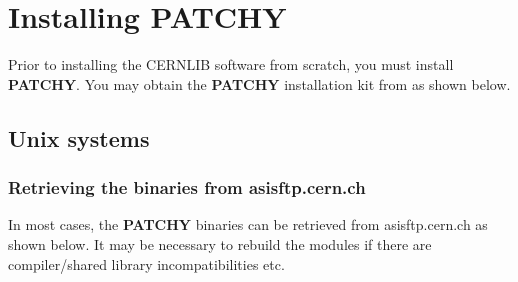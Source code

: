\chapter{Installing PATCHY}

Prior to installing the CERNLIB software from scratch, you must install
{\bf PATCHY}. You may obtain the {\bf PATCHY} installation kit from
as shown below.

\section{Unix systems}

\label{sect-UNIXPATCHY}

\subsection{Retrieving the binaries from asisftp.cern.ch}

In most cases, the {\bf PATCHY} binaries can be retrieved
from asisftp.cern.ch as shown below. It may be necessary
to rebuild the modules if there are compiler/shared library
incompatibilities etc.


